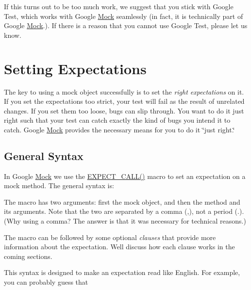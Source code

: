 If this turns out to be too much work, we suggest that you stick with Google Test, which works with Google \mbox{\hyperlink{classMock}{Mock}} seamlessly (in fact, it is technically part of Google \mbox{\hyperlink{classMock}{Mock}}.). If there is a reason that you cannot use Google Test, please let us know.

\section*{Setting Expectations}

The key to using a mock object successfully is to set the {\itshape right expectations} on it. If you set the expectations too strict, your test will fail as the result of unrelated changes. If you set them too loose, bugs can slip through. You want to do it just right such that your test can catch exactly the kind of bugs you intend it to catch. Google \mbox{\hyperlink{classMock}{Mock}} provides the necessary means for you to do it \char`\"{}just right.\char`\"{}

\subsection*{General Syntax}

In Google \mbox{\hyperlink{classMock}{Mock}} we use the {\ttfamily \mbox{\hyperlink{gmock-spec-builders_8h_a535a6156de72c1a2e25a127e38ee5232}{E\+X\+P\+E\+C\+T\+\_\+\+C\+A\+L\+L()}}} macro to set an expectation on a mock method. The general syntax is\+:


\begin{DoxyCode}{0}
\end{DoxyCode}


The macro has two arguments\+: first the mock object, and then the method and its arguments. Note that the two are separated by a comma ({\ttfamily ,}), not a period ({\ttfamily .}). (Why using a comma? The answer is that it was necessary for technical reasons.)

The macro can be followed by some optional {\itshape clauses} that provide more information about the expectation. We\textquotesingle{}ll discuss how each clause works in the coming sections.

This syntax is designed to make an expectation read like English. For example, you can probably guess that


